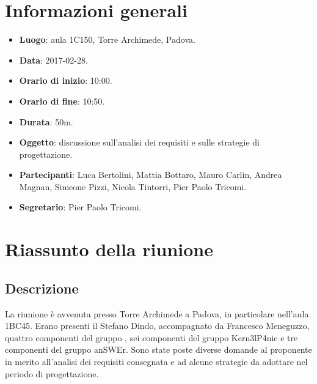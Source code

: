\documentclass[a4paper,titlepage]{article}
\begin{document}
\maketitle
\begin{diario}
\end{diario}
\newpage
\tableofcontents

\newpage
\section{Informazioni generali}
\label{sec:Informazioni}

\begin{itemize}
  \item \textbf{Luogo}: aula 1C150, Torre Archimede, Padova.
  \item \textbf{Data}: 2017-02-28.
  \item \textbf{Orario di inizio}: 10:00.
  \item \textbf{Orario di fine}: 10:50.
  \item \textbf{Durata}: 50m.
  \item \textbf{Oggetto}: discussione sull'analisi dei requisiti e sulle strategie di progettazione.
  \item \textbf{Partecipanti}: Luca Bertolini, Mattia Bottaro, Mauro Carlin, Andrea Magnan, Simeone Pizzi, Nicola Tintorri, Pier Paolo Tricomi.
  \item \textbf{Segretario}: Pier Paolo Tricomi.

\end{itemize}
\section{Riassunto della riunione}
\label{sec:RiassuntoRiunione}
 \subsection{Descrizione}
La riunione è avvenuta presso Torre Archimede a Padova, in particolare nell'aula 1BC45. Erano presenti il  Stefano Dindo, accompagnato da Francesco Meneguzzo, quattro componenti del gruppo \GRUPPO{}, sei componenti del gruppo Kern3lP4nic e tre componenti del gruppo anSWEr. Sono state poste diverse domande al proponente in merito all'analisi dei requisiti consegnata e ad alcune strategie da adottare nel periodo di progettazione.
\end{document}
